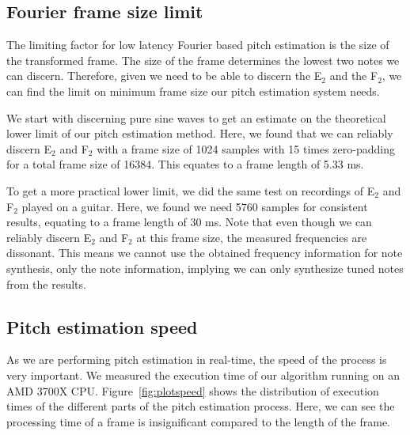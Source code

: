 \documentclass[a4paper,10pt,twocolumn]{article}
\newcommand{\note}[2]{#1${}_{#2}$}
\begin{document}
\subsection{Fourier frame size limit}
The limiting factor for low latency Fourier based pitch estimation is the size of the transformed frame. The size of the frame determines the lowest two notes we can discern. Therefore, given we need to be able to discern the \note{E}{2} and the \note{F}{2}, we can find the limit on minimum frame size our pitch estimation system needs.

We start with discerning pure sine waves to get an estimate on the theoretical lower limit of our pitch estimation method. Here, we found that we can reliably discern \note{E}{2} and \note{F}{2} with a frame size of 1024 samples with 15 times zero-padding for a total frame size of 16384. This equates to a frame length of 5.33 ms.

To get a more practical lower limit, we did the same test on recordings of \note{E}{2} and \note{F}{2} played on a guitar. Here, we found we need 5760 samples for consistent results, equating to a frame length of 30 ms. Note that even though we can reliably discern \note{E}{2} and \note{F}{2} at this frame size, the measured frequencies are dissonant. This means we cannot use the obtained frequency information for note synthesis, only the note information, implying we can only synthesize tuned notes from the results.
\vfill\pagebreak

\subsection{Pitch estimation speed}  \label{sub:expspeed}
As we are performing pitch estimation in real-time, the speed of the process is very important. We measured the execution time of our algorithm running on an AMD 3700X CPU. Figure~\ref{fig:plotspeed} shows the distribution of execution times of the different parts of the pitch estimation process. Here, we can see the processing time of a frame is insignificant compared to the length of the frame.

\end{document}
